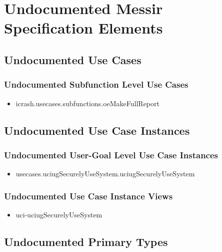 	
\chapter{Undocumented Messir Specification Elements}


\section[Undocumented Use Cases]{Undocumented Use Cases}



\subsection[Undocumented Use Cases - Subfunction Level]{Undocumented Subfunction Level Use Cases}
\begin{itemize}
\item icrash.usecases.subfunctions.oeMakeFullReport 
\end{itemize}





\section[Undocumented Use Case Instances]{Undocumented Use Case Instances}


\subsection[Undocumented Use Case Instances - User-Goal Level]{Undocumented User-Goal Level Use Case Instances}
\begin{itemize}
\item usecases.uciugSecurelyUseSystem.uciugSecurelyUseSystem 
\end{itemize}


\subsection[Undocumented Use Case Instance Views]{Undocumented Use Case Instance Views}
\begin{itemize}
\item uci-uciugSecurelyUseSystem 
\end{itemize}






\section[Undocumented Primary Types]{Undocumented Primary Types}

